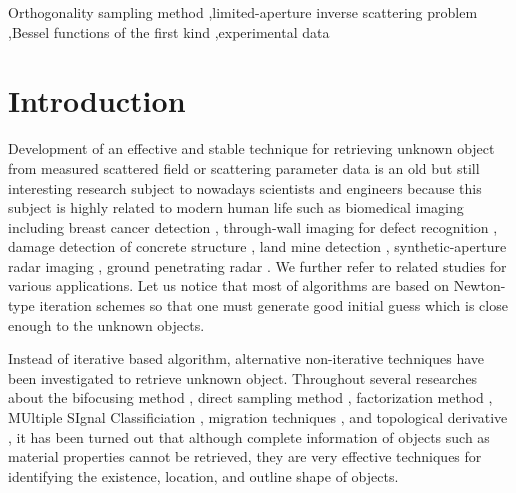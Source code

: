 \documentclass[3p,10pt]{elsarticle}
\theoremstyle{plain}
\theoremstyle{remark}
\begin{document}
\begin{frontmatter}
\begin{keyword}
Orthogonality sampling method \sep limited-aperture inverse scattering problem \sep Bessel functions of the first kind \sep experimental data


\end{keyword}

\end{frontmatter}







\section{Introduction}\label{sec:1}
Development of an effective and stable technique for retrieving unknown object from measured scattered field or scattering parameter data is an old but still interesting research subject to nowadays scientists and engineers because this subject is highly related to modern human life such as biomedical imaging \cite{ABM,ML2} including breast cancer detection \cite{CBC,SKLJS}, through-wall imaging for defect recognition \cite{B6,SSA}, damage detection of concrete structure \cite{FFK,WZZ}, land mine detection \cite{DEKPS,GCGGC}, synthetic-aperture radar imaging \cite{C2,GS}, ground penetrating radar \cite{LFNA,LSL}. We further refer to related studies \cite{A1,A2,BCS,C7,CK,N3,P-Book,Z2} for various applications. Let us notice that most of algorithms are based on Newton-type iteration schemes so that one must generate good initial guess which is close enough to the unknown objects.

Instead of iterative based algorithm, alternative non-iterative techniques have been investigated to retrieve unknown object. Throughout several researches about the bifocusing method \cite{JBRBTFC,KP4,SP2}, direct sampling method \cite{AHP2,IJZ1,KLAHP}, factorization method \cite{GYJH,LLP,P-FAC1}, MUltiple SIgnal Classificiation \cite{AILP,P-MUSIC6,ZC}, migration techniques \cite{AGKPS,P-SUB11,P-SUB18}, and topological derivative \cite{FPRV,LR1,P-TD5}, it has been turned out that although complete information of objects such as material properties cannot be retrieved, they are very effective techniques for identifying the existence, location, and outline shape of objects.
\end{document}
